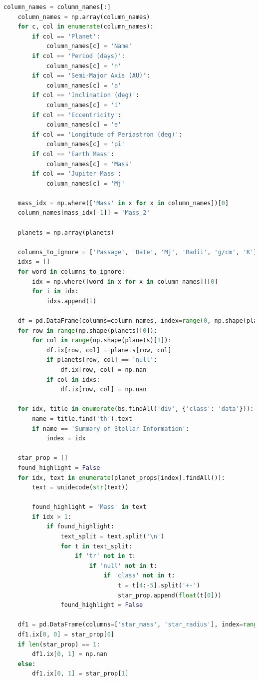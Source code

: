 \documentclass[11pt, oneside]{article}   	%
\begin{document}
\begin{lstlisting}[language=Python, caption={Extracting data from \href{https://exoplanetarchive.ipac.caltech.edu/}{Nasa Exoplanet Archive}}]
    column_names = column_names[:]
    column_names = np.array(column_names)
    for c, col in enumerate(column_names):
        if col == 'Planet':
            column_names[c] = 'Name'
        if col == 'Period (days)':
            column_names[c] = 'n'
        if col == 'Semi-Major Axis (AU)':
            column_names[c] = 'a'
        if col == 'Inclination (deg)':
            column_names[c] = 'i'
        if col == 'Eccentricity':
            column_names[c] = 'e'
        if col == 'Longitude of Periastron (deg)':
            column_names[c] = 'pi'
        if col == 'Earth Mass':
            column_names[c] = 'Mass'
        if col == 'Jupiter Mass':
            column_names[c] = 'Mj'

    mass_idx = np.where(['Mass' in x for x in column_names])[0]
    column_names[mass_idx[-1]] = 'Mass_2'

    planets = np.array(planets)

    columns_to_ignore = ['Passage', 'Date', 'Mj', 'Radii', 'g/cm', 'K']
    idxs = []
    for word in columns_to_ignore:
        idx = np.where([word in x for x in column_names])[0]
        for i in idx:
            idxs.append(i)

    df = pd.DataFrame(columns=column_names, index=range(0, np.shape(planets)[0]))
    for row in range(np.shape(planets)[0]):
        for col in range(np.shape(planets)[1]):
            df.ix[row, col] = planets[row, col]
            if planets[row, col] == 'null':
                df.ix[row, col] = np.nan
            if col in idxs:
                df.ix[row, col] = np.nan

    for idx, title in enumerate(bs.findAll('div', {'class': 'data'})):
        name = title.find('th').text
        if name == 'Summary of Stellar Information':
            index = idx

    star_prop = []
    found_highlight = False
    for idx, text in enumerate(planet_props[index].findAll()):
        text = unidecode(str(text))

        found_highlight = 'Mass' in text
        if idx > 1:
            if found_highlight:
                text_split = text.split('\n')
                for t in text_split:
                    if 'tr' not in t:
                        if 'null' not in t:
                            if 'class' not in t:
                                t = t[4:-5].split('+-')
                                star_prop.append(float(t[0]))
                found_highlight = False
                
    df1 = pd.DataFrame(columns=['star_mass', 'star_radius'], index=range(0, 1))
    df1.ix[0, 0] = star_prop[0]
    if len(star_prop) == 1:
        df1.ix[0, 1] = np.nan
    else:
        df1.ix[0, 1] = star_prop[1]


\end{lstlisting}
\end{document}
